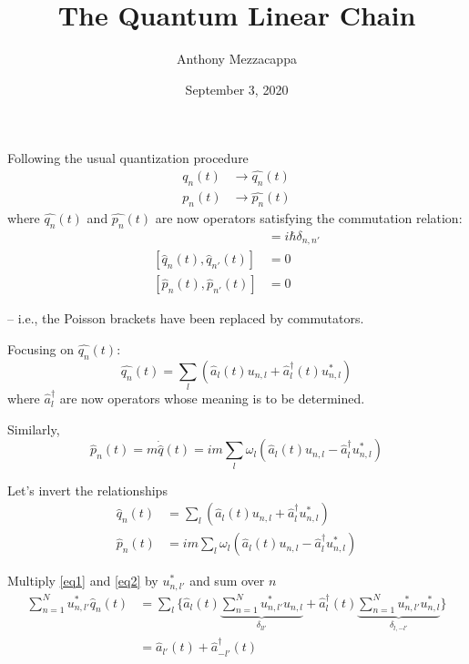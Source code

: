\documentclass{article}
\title{The Quantum Linear Chain}
\author{Anthony Mezzacappa}
\date{September 3, 2020}
\begin{document}
\maketitle

\noindent Following the usual quantization procedure
\begin{align*}
    q_n(t) &\longrightarrow \hat{q_n}(t) \\
    p_n(t) &\longrightarrow \hat{p_n}(t)
\end{align*}
where $\hat{q_n}(t)$ and $\hat{p_n}(t)$ are now operators satisfying the commutation relation:
\begin{align*}
    [ \hat{q_n} (t), \hat{p_{n'}}(t)] &= i\hbar \delta_{n,n'} \\
    [ \hat{q}_n (t), \hat{q}_{n'} (t) ] &= 0 \\
    [ \hat{p}_n (t), \hat{p}_{n'} (t) ] &= 0 
\end{align*}

\noindent -- i.e., the Poisson brackets have been replaced by commutators.

\noindent Focusing on $\hat{q_n} (t)$:
\begin{equation*}
    \hat{q_n} (t) = \sum_l ( \hat{a}_l (t) u_{ n, l } + \hat{a}^\dagger_l (t) u^*_{n, l} )
\end{equation*}
where $\hat{a}^\dagger_l$ are now operators whose meaning is to be determined.

\noindent Similarly,
\begin{equation*}
    \hat{p}_n (t) = m \Dot{\hat{q}} (t) = i m \sum_l \omega_l \left( \hat{a}_l (t) u_{ n, l } - \hat{a}^\dagger_l u^*_{ n, l }  \right)
\end{equation*}


\noindent Let's invert the relationships
\begin{align}
    \hat{q}_n (t) &= \sum_l \left( \hat{a}_l (t) u_{ n, l } + \hat{a}^\dagger_l u^*_{ n, l } \right) \label{eq1} \\ %
    \hat{p}_n (t) &= i m \sum_l \omega_l \left( \hat{a}_l (t) u_{ n, l } - \hat{a}^\dagger_l u^*_{ n, l } \right) \label{eq2} %
\end{align}

\noindent Multiply \eqref{eq1} and \eqref{eq2} by $ u^*_{ n, l' } $ and sum over $n$
\begin{align}
    \sum_{ n = 1 }^N u^*_{ n, l' } \hat{q}_n (t) &= \sum_l \biggl\lbrace \hat{a}_l (t) {\underbrace{ \sum_{ n = 1 }^N u^*_{ n, l' } u_{ n, l } }_{\delta_{ l l' } }} + \hat{a}^\dagger_l (t) {\underbrace{ \sum_{ n = 1 }^N u^*_{ n, l' } u^*_{ n, l } }_{ \delta_{ l, -l' } }} \biggr\rbrace \nonumber \\
    &= \hat{a}_{l'} (t) + \hat{a}^\dagger_{-l'} (t) \label{eq3} %
\end{align}
\end{document}
